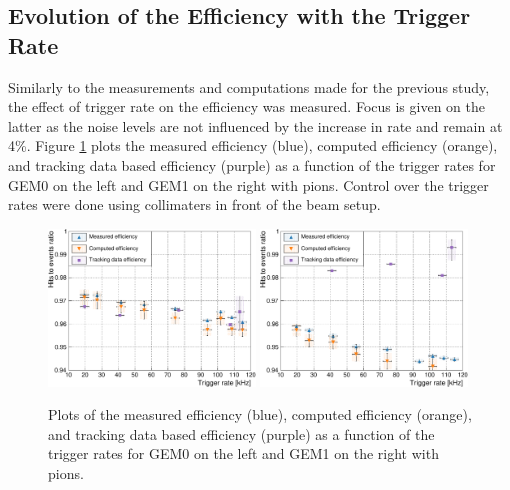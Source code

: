     \subsection{Evolution of the Efficiency with the Trigger Rate}

      Similarly to the measurements and computations made for the previous study, the effect of trigger rate on the efficiency was measured. Focus is given on the latter as the noise levels are not influenced by the increase in rate and remain at 4\%. Figure \ref{fig:II-3-data-eff-rate} plots the measured efficiency (blue), computed efficiency (orange), and tracking data based efficiency (purple) as a function of the trigger rates for GEM0 on the left and GEM1 on the right with pions. Control over the trigger rates were done using collimaters in front of the beam setup. \\

      \begin{figure}[h!]
        \centering
        \includegraphics[width=0.49\textwidth]{img/plots/cEfficiency_Rate_GEM0-crop}
        \includegraphics[width=0.49\textwidth]{img/plots/cEfficiency_Rate_GEM1-crop}
        \caption{Plots of the measured efficiency (blue), computed efficiency (orange), and tracking data based efficiency (purple) as a function of the trigger rates for GEM0 on the left and GEM1 on the right with pions.}
        \label{fig:II-3-data-eff-rate}
      \end{figure}

